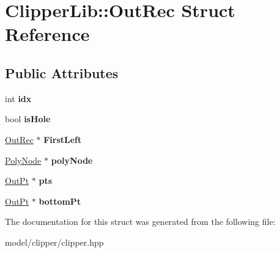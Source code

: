 \hypertarget{structClipperLib_1_1OutRec}{\section{Clipper\-Lib\-:\-:Out\-Rec Struct Reference}
\label{structClipperLib_1_1OutRec}
}
\subsection*{Public Attributes}
\begin{DoxyCompactItemize}
\item 
\hypertarget{structClipperLib_1_1OutRec_a86f3792d595bf0b43080973e25530325}{int {\bfseries idx}}\label{structClipperLib_1_1OutRec_a86f3792d595bf0b43080973e25530325}

\item 
\hypertarget{structClipperLib_1_1OutRec_a0d3a9a11fb66b802754f7a4709f55ed9}{bool {\bfseries is\-Hole}}\label{structClipperLib_1_1OutRec_a0d3a9a11fb66b802754f7a4709f55ed9}

\item 
\hypertarget{structClipperLib_1_1OutRec_aa8baa934f1a7687a16b88a579dec3dd4}{\hyperlink{structClipperLib_1_1OutRec}{Out\-Rec} $\ast$ {\bfseries First\-Left}}\label{structClipperLib_1_1OutRec_aa8baa934f1a7687a16b88a579dec3dd4}

\item 
\hypertarget{structClipperLib_1_1OutRec_a77fe49710e99367de8704cd570338d49}{\hyperlink{classClipperLib_1_1PolyNode}{Poly\-Node} $\ast$ {\bfseries poly\-Node}}\label{structClipperLib_1_1OutRec_a77fe49710e99367de8704cd570338d49}

\item 
\hypertarget{structClipperLib_1_1OutRec_a81021383d06dbfb7b247d053205529f2}{\hyperlink{structClipperLib_1_1OutPt}{Out\-Pt} $\ast$ {\bfseries pts}}\label{structClipperLib_1_1OutRec_a81021383d06dbfb7b247d053205529f2}

\item 
\hypertarget{structClipperLib_1_1OutRec_a81695c0c62beef7de4bbb758290ae68d}{\hyperlink{structClipperLib_1_1OutPt}{Out\-Pt} $\ast$ {\bfseries bottom\-Pt}}\label{structClipperLib_1_1OutRec_a81695c0c62beef7de4bbb758290ae68d}

\end{DoxyCompactItemize}


The documentation for this struct was generated from the following file\-:\begin{DoxyCompactItemize}
\item 
model/clipper/clipper.\-hpp\end{DoxyCompactItemize}
